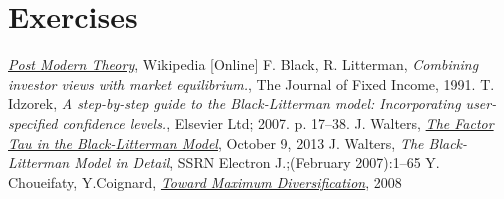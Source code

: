 \section*{Exercises}


\begin{thebibliography}{9}
\href{https://en.wikipedia.org/wiki/Post-modern_portfolio_theory}{\emph{Post Modern Theory}}, Wikipedia [Online]
 F. Black, R. Litterman, \emph{Combining investor views with market equilibrium.}, The Journal of Fixed Income, 1991.
 T. Idzorek, \emph{A step-by-step guide to the Black-Litterman model: Incorporating user-specified confidence levels.}, Elsevier Ltd; 2007. p. 17–38.
 J. Walters, \href{https://ssrn.com/abstract=1701467}{\emph{The Factor Tau in the Black-Litterman Model}}, October 9, 2013
 J. Walters, \emph{The Black-Litterman Model in Detail}, SSRN Electron J.;(February 2007):1–65
 Y. Choueifaty, Y.Coignard, \href{ https://www.tobam.fr/wp-content/uploads/2014/12/TOBAM-JoPM-Maximum-Div-2008.pdf}{\emph{Toward Maximum Diversification}}, 2008
\end{thebibliography}
